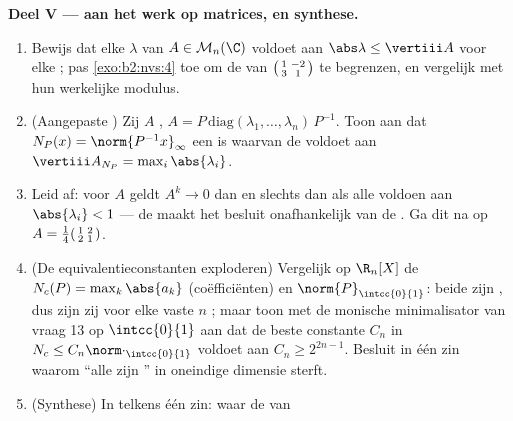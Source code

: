 \begin{problem}
\medskip
\noindent\textbf{Deel V ---  aan het werk op matrices, en
synthese.}
\begin{enumerate}[resume]
  \item Bewijs dat elke  $\lambda$ van $A \in
        \mathcal{M}_n(\C)$ voldoet aan $\abs\lambda \leq \vertiii
        A$ voor elke ; pas \cref{exo:b2:nvs:4} toe om
        de  van $\begin{psmallmatrix}1 & -2\\ 3 &
        1\end{psmallmatrix}$ te begrenzen, en vergelijk met hun
        werkelijke modulus.
  \item (Aangepaste ) Zij $A$ , $A =
        P\,\mathrm{diag}(\lambda_1, \dots, \lambda_n)\,P^{-1}$.
        Toon aan dat $N_P(x) = \norm{P^{-1}x}_\infty$ een  is
        waarvan de  voldoet aan $\vertiii A_{N_P} =
        \max_i\abs{\lambda_i}$.
  \item Leid af: voor  $A$ geldt $A^k \to 0$ dan
        en slechts dan als alle  voldoen aan
        $\abs{\lambda_i} < 1$ --- de  maakt
        het besluit onafhankelijk van de . Ga dit na op $A =
        \frac14\begin{psmallmatrix}1 & 2\\ 2 &
        1\end{psmallmatrix}$.
  \item (De equivalentieconstanten exploderen) Vergelijk op
        $\R_n[X]$ de  $N_c(P) = \max_k \abs{a_k}$
        (coëfficiënten) en $\norm{P}_{\intcc{0}{1}}$: beide zijn
        , dus zijn zij voor elke vaste $n$ ; maar
        toon met de monische minimalisator van vraag 13 op
        $\intcc{0}{1}$ aan dat de beste constante $C_n$ in $N_c
        \leq C_n\norm\cdot_{\intcc{0}{1}}$ voldoet aan $C_n \geq
        2^{2n-1}$. Besluit in één zin waarom ``alle  zijn
        '' in oneindige dimensie sterft.
  \item (Synthese) In telkens één zin: waar de  van

\end{enumerate}
\end{problem}
